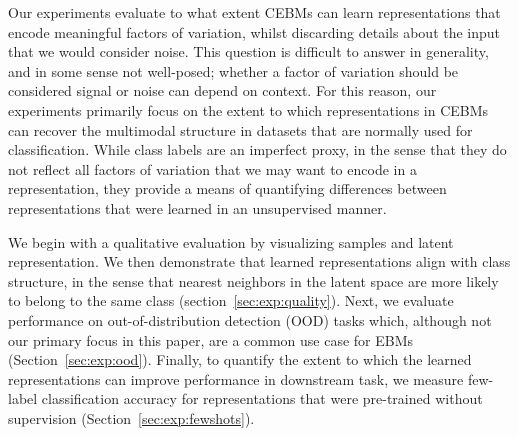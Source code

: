 \documentclass{article}
\begin{document}
% 

Our experiments evaluate to what extent CEBMs can learn representations that encode meaningful factors of variation, whilst discarding details about the input that we would consider noise. This question is difficult to answer in generality, and in some sense not well-posed; whether a factor of variation should be considered signal or noise can depend on context. For this reason, our experiments primarily focus on the extent to which representations in CEBMs can recover the multimodal structure in datasets that are normally used for classification. %
While class labels are an imperfect proxy, in the sense that they do not reflect all factors of variation that we may want to encode in a representation, they provide a means of quantifying differences between representations that were learned in an unsupervised manner. 

We begin with a qualitative evaluation by visualizing samples and latent representation. We then demonstrate that learned representations align with class structure, in the sense that nearest neighbors in the latent space are more likely to belong to the same class (section~\ref{sec:exp:quality}). Next, we evaluate performance on out-of-distribution detection (OOD) tasks which, although not our primary focus in this paper, are a common use case for EBMs (Section~\ref{sec:exp:ood}).  %
Finally, to quantify the extent to which the learned representations can improve performance in downstream task, we measure few-label classification accuracy for representations that were pre-trained without supervision (Section~\ref{sec:exp:fewshots}).

\end{document}
